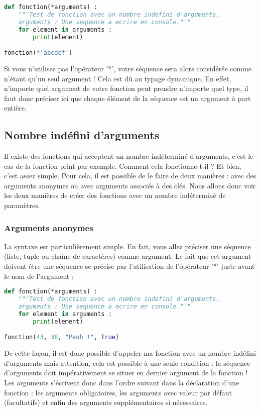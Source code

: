 \documentclass[a4paper,twoside]{article}
\begin{document}
\begin{lstlisting}[language=python]
def fonction(*arguments) :
    """Test de fonction avec un nombre indefini d'arguments.
    arguments : Une sequence a ecrire en console."""
    for element in arguments :
        print(element)

fonction(*'abcdef')
\end{lstlisting}

Si vous n'utilisez pas l'opérateur '*', votre séquence sera alors considérée comme n'étant qu'un seul argument ! Cela est dû au typage dynamique. En effet, n'importe quel argument de votre fonction peut prendre n'importe quel type, il faut donc préciser ici que chaque élément de la séquence est un argument à part entière.

\subsection{Nombre indéfini d'arguments}

Il existe des fonctions qui acceptent un nombre indéterminé d'arguments, c'est le cas de la fonction print par exemple. Comment cela fonctionne-t-il ? Et bien, c'est assez simple. Pour cela, il est possible de le faire de deux manières : avec des arguments anonymes ou avec arguments associés à des clés. Nous allons donc voir les deux manières de créer des fonctions avec un nombre indéterminé de paramètres.

\subsubsection{Arguments anonymes}

La syntaxe est particulièrement simple. En fait, vous allez préciser une séquence (liste, tuple ou chaîne de caractères) comme argument. Le fait que cet argument doivent être une séquence se précise par l'utilisation de l'opérateur '*' juste avant le nom de l'argument :

\begin{lstlisting}[language=python]
def fonction(*arguments) :
    """Test de fonction avec un nombre indefini d'arguments.
    arguments : Une sequence a ecrire en console."""
    for element in arguments :
        print(element)

fonction(43, 38, "Peuh !", True)
\end{lstlisting}

De cette façon, il est donc possible d'appeler ma fonction avec un nombre indéfini d'arguments mais attention, cela est possible à une seule condition : la séquence d'arguments doit impérativement se situer en dernier argument de la fonction ! Les arguments s'écrivent donc dans l'ordre suivant dans la déclaration d'une fonction : les arguments obligatoires, les arguments avec valeur par défaut (facultatifs) et enfin des arguments supplémentaires si nécessaires.
\end{document}
